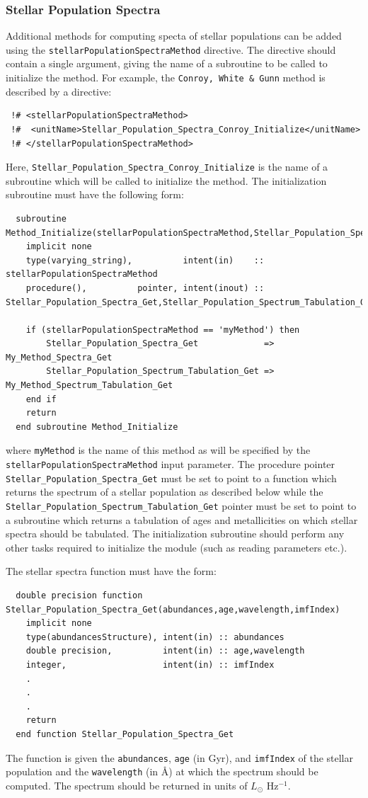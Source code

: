 \subsubsection{Stellar Population Spectra}\label{sec:StellarPopulationSpectra}

Additional methods for computing specta of stellar populations can be added using the {\tt stellarPopulationSpectraMethod} directive. The directive should contain a single argument, giving the name of a subroutine to be called to initialize the method. For example, the {\tt Conroy, White \& Gunn} method is described by a directive:
\begin{verbatim}
 !# <stellarPopulationSpectraMethod>
 !#  <unitName>Stellar_Population_Spectra_Conroy_Initialize</unitName>
 !# </stellarPopulationSpectraMethod>
\end{verbatim}
Here, {\tt Stellar\_Population\_Spectra\_Conroy\_Initialize} is the name of a subroutine which will be called to initialize the method. The initialization subroutine must have the following form:
\begin{verbatim}
  subroutine Method_Initialize(stellarPopulationSpectraMethod,Stellar_Population_Spectra_Get,Stellar_Population_Spectrum_Tabulation_Get)
    implicit none
    type(varying_string),          intent(in)    :: stellarPopulationSpectraMethod
    procedure(),          pointer, intent(inout) :: Stellar_Population_Spectra_Get,Stellar_Population_Spectrum_Tabulation_Get
    
    if (stellarPopulationSpectraMethod == 'myMethod') then
        Stellar_Population_Spectra_Get             => My_Method_Spectra_Get
        Stellar_Population_Spectrum_Tabulation_Get => My_Method_Spectrum_Tabulation_Get
    end if
    return
  end subroutine Method_Initialize
\end{verbatim}
where {\tt myMethod} is the name of this method as will be specified by the {\tt stellarPopulationSpectraMethod} input parameter. The procedure pointer {\tt Stellar\_Population\_Spectra\_Get} must be set to point to a function which returns the spectrum of a stellar population as described below while the {\tt Stellar\_Population\_Spectrum\_Tabulation\_Get} pointer must be set to point to a subroutine which returns a tabulation of ages and metallicities on which stellar spectra should be tabulated. The initialization subroutine should perform any other tasks required to initialize the module (such as reading parameters etc.).

The stellar spectra function must have the form:
\begin{verbatim}
  double precision function Stellar_Population_Spectra_Get(abundances,age,wavelength,imfIndex)
    implicit none
    type(abundancesStructure), intent(in) :: abundances
    double precision,          intent(in) :: age,wavelength
    integer,                   intent(in) :: imfIndex
    .
    .
    .
    return
  end function Stellar_Population_Spectra_Get
\end{verbatim}
The function is given the {\tt abundances}, {\tt age} (in Gyr), and {\tt imfIndex} of the stellar population and the {\tt wavelength} (in \AA) at which the spectrum should be computed. The spectrum should be returned in units of $L_\odot$ Hz$^{-1}$.

